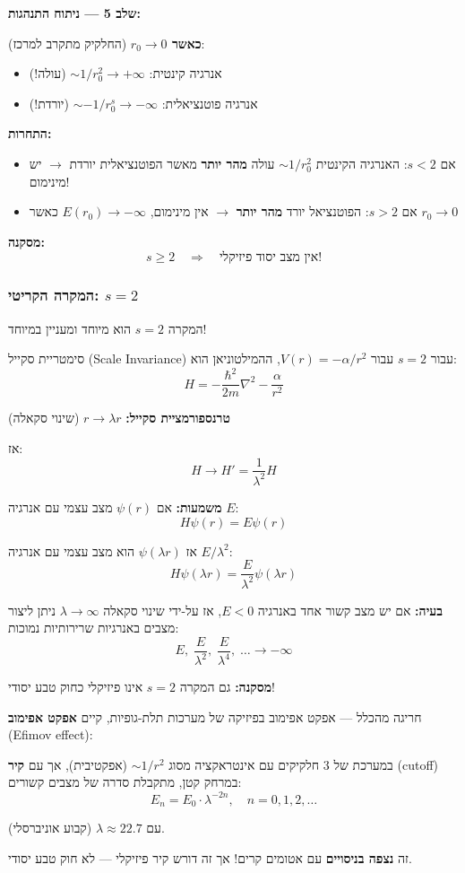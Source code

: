 \textbf{שלב 5 — ניתוח התנהגות:}

\textbf{כאשר $r_0 \to 0$} (החלקיק מתקרב למרכז):
\begin{itemize}
    \item אנרגיה קינטית: $\sim 1/r_0^2 \to +\infty$ (עולה!)
    \item אנרגיה פוטנציאלית: $\sim -1/r_0^s \to -\infty$ (יורדת!)
\end{itemize}

\textbf{התחרות:}
\begin{itemize}
    \item אם $s < 2$: האנרגיה הקינטית $\sim 1/r_0^2$ עולה \textbf{מהר יותר} מאשר הפוטנציאלית יורדת $\to$ יש מינימום!
    \item אם $s > 2$: הפוטנציאל יורד \textbf{מהר יותר} $\to$ אין מינימום, $E(r_0) \to -\infty$ כאשר $r_0 \to 0$
\end{itemize}

\textbf{מסקנה:}
\[
\boxed{s \geq 2 \quad \Rightarrow \quad \text{אין מצב יסוד פיזיקלי!}}
\]


\subsubsection*{המקרה הקריטי: $s = 2$}

המקרה $s = 2$ הוא מיוחד ומעניין במיוחד!

\begin{theorembox}{סימטריית סקייל (Scale Invariance) עבור $s = 2$}
עבור $V(r) = -\alpha/r^2$, ההמילטוניאן הוא:
\[
H = -\frac{\hbar^2}{2m}\nabla^2 - \frac{\alpha}{r^2}
\]

\textbf{טרנספורמציית סקייל:} $r \to \lambda r$ (שינוי סקאלה)

אז:
\[
H \to H' = \frac{1}{\lambda^2} H
\]

\textbf{משמעות:} אם $\psi(r)$ מצב עצמי עם אנרגיה $E$:
\[
H\psi(r) = E\psi(r)
\]

אז $\psi(\lambda r)$ הוא מצב עצמי עם אנרגיה $E/\lambda^2$:
\[
H\psi(\lambda r) = \frac{E}{\lambda^2}\psi(\lambda r)
\]

\textbf{בעיה:} אם יש מצב קשור אחד באנרגיה $E < 0$, אז על-ידי שינוי סקאלה $\lambda \to \infty$ ניתן ליצור מצבים באנרגיות שרירותיות נמוכות:
\[
E, \; \frac{E}{\lambda^2}, \; \frac{E}{\lambda^4}, \; \ldots \to -\infty
\]

\textbf{מסקנה:} גם המקרה $s = 2$ אינו פיזיקלי כחוק טבע יסודי!
\end{theorembox}

\begin{notebox}{חריגה מהכלל — אפקט אפימוב}
בפיזיקה של מערכות תלת-גופיות, קיים \textbf{אפקט אפימוב} (Efimov effect):

במערכת של 3 חלקיקים עם אינטראקציה מסוג $\sim 1/r^2$ (אפקטיבית), אך עם \textbf{קיר} (cutoff) במרחק קטן, מתקבלת סדרה של מצבים קשורים:
\[
E_n = E_0 \cdot \lambda^{-2n}, \quad n = 0, 1, 2, \ldots
\]

עם $\lambda \approx 22.7$ (קבוע אוניברסלי).

זה \textbf{נצפה בניסויים} עם אטומים קרים! אך זה דורש קיר פיזיקלי — לא חוק טבע יסודי.
\end{notebox}

